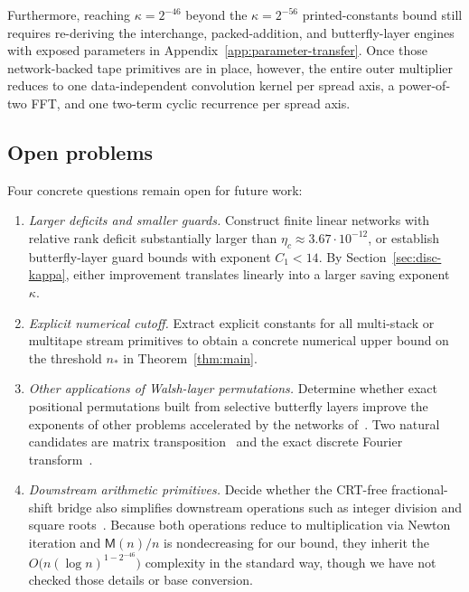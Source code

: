 Furthermore, reaching $\kappa=2^{-46}$ beyond the $\kappa=2^{-56}$ printed-constants bound still requires re-deriving the interchange, packed-addition, and butterfly-layer engines with exposed parameters in Appendix~\ref{app:parameter-transfer}. Once those network-backed tape primitives are in place, however, the entire outer multiplier reduces to one data-independent convolution kernel per spread axis, a power-of-two FFT, and one two-term cyclic recurrence per spread axis.

\subsection{Open problems}\label{sec:disc-open}

Four concrete questions remain open for future work:
\begin{enumerate}[label=(\arabic*),leftmargin=*,itemsep=2pt]
  \item \emph{Larger deficits and smaller guards.} Construct finite linear networks with relative rank deficit substantially larger than $\eta_c\approx 3.67\cdot 10^{-12}$, or establish butterfly-layer guard bounds with exponent $C_1<14$. By Section~\ref{sec:disc-kappa}, either improvement translates linearly into a larger saving exponent~$\kappa$.

  \item \emph{Explicit numerical cutoff.} Extract explicit constants for all multi-stack or multitape stream primitives to obtain a concrete numerical upper bound on the threshold $n_*$ in Theorem~\ref{thm:main}.

  \item \emph{Other applications of Walsh-layer permutations.} Determine whether exact positional permutations built from selective butterfly layers improve the exponents of other problems accelerated by the networks of~\cite{OAI26}. Two natural candidates are matrix transposition~\cite[\S11]{OAI26} and the exact discrete Fourier transform~\cite{OAI26b}.

  \item \emph{Downstream arithmetic primitives.} Decide whether the CRT-free fractional-shift bridge also simplifies downstream operations such as integer division and square roots~\cite[\S10]{OAI26}. Because both operations reduce to multiplication via Newton iteration and $\mathsf M(n)/n$ is nondecreasing for our bound, they inherit the $O\bigl(n(\log n)^{1-2^{-46}}\bigr)$ complexity in the standard way, though we have not checked those details or base conversion.
\end{enumerate}

